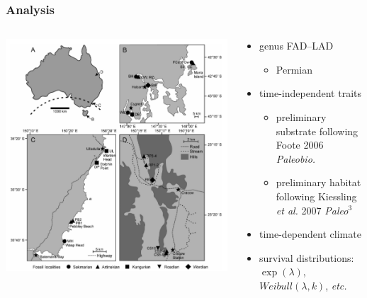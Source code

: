 \documentclass{beamer}
\begin{document}
\begin{frame}
  \frametitle{Analysis}

  \begin{columns}
    \begin{column}{0.5\textwidth}
      \begin{center}
        \includegraphics[height = 0.8\textheight, width = \textwidth, keepaspectratio = true]{figure/australia}

        \tiny{}
      \end{center}
    \end{column}
    \begin{column}{0.5\textwidth}
      \begin{itemize}
        \item genus FAD--LAD
          \begin{itemize}
            \item Permian
          \end{itemize}
        \item time-independent traits
          \begin{itemize}
            \item preliminary substrate following Foote 2006 \textit{Paleobio.}
            \item preliminary habitat following Kiessling \textit{et al.} 2007 \textit{Paleo\(^3\)}
          \end{itemize}
        \item time-dependent climate 
        \item survival distributions: \(\exp(\lambda)\), \(Weibull(\lambda, k)\), \textit{etc.}
      \end{itemize}
    \end{column}
  \end{columns}
\end{frame}
\end{document}
